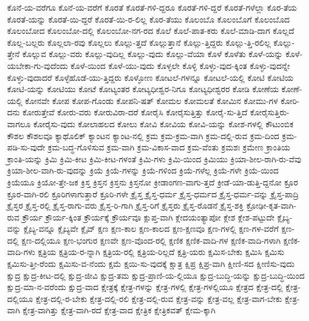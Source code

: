 {ಕೊನೆ-ಯ-ವರೆಗೂ
ಕೊನೆ-ಯ-ವರೆಗೆ
ಕೊರತೆ
ಕೊರತೆ-ಗಳಿ-ದ್ದರೂ
ಕೊರತೆ-ಗಳಿ-ದ್ದರೆ
ಕೊರತೆ-ಗಳೆಲ್ಲಾ
ಕೊರ-ತೆಯ
ಕೊರತೆ-ಯನ್ನು
ಕೊರತೆ-ಯಿ-ದ್ದರೆ
ಕೊರತೆ-ಯಿ-ರ-ಲಿಲ್ಲ
ಕೊರ-ತೆಯು
ಕೊಲಂಬೊ
ಕೊಲಂಬೊಗೆ
ಕೊಲಂಬೊದ
ಕೊಲಂಬೋದ
ಕೊಲಂಬೋ-ದಲ್ಲಿ
ಕೊಲಂಬೋ-ನಗ-ರದ
ಕೊಲೆ
ಕೊಲೆ-ಪಾತ-ಕರು
ಕೊಲೆ-ಮಾಡಿ-ದಾಗ
ಕೊಲ್ಲದೆ
ಕೊಲ್ಲ-ಬಲ್ಲರು
ಕೊಲ್ಲಲಾ-ರವು
ಕೊಲ್ಲಲು
ಕೊಲ್ಲು-ತ್ತದೆ
ಕೊಲ್ಲುತ್ತಾನೆ
ಕೊಲ್ಲು-ತ್ತಿದ್ದರು
ಕೊಲ್ಲು-ತ್ತಿ-ರಲಿಲ್ಲ
ಕೊಲ್ಲು-ತ್ತೇನೆ
ಕೊಲ್ಲುವ
ಕೊಲ್ಲು-ವರು
ಕೊಲ್ಲು-ವುದಿಲ್ಲ
ಕೊಲ್ಲು-ವುದು
ಕೊಲ್ಲು-ವೆಯಾ
ಕೊಳೆ
ಕೊಳೆತು
ಕೊಳೆ-ಯನ್ನು
ಕೊಳೆ-ಯಬೇಕಾ-ಗು-ವುದೆಂದು
ಕೊಳೆ-ಯಿಂದ
ಕೊಳೆ-ಯು-ವುದು
ಕೊಳ್ಳಲೇ
ಕೊಳ್ಳಿ
ಕೊಳ್ಳು-ವುದ-ಕ್ಕಿಂತ
ಕೊಳ್ಳು-ವುದನ್ನೇ
ಕೊಳ್ಳು-ವುದಾದರೆ
ಕೊಳ್ಳೆಹೊಡೆ-ಯು-ತ್ತಿದ್ದರು
ಕೊಳ್ಳೋಣ
ಕೋಟಲೆ-ಗಳನ್ನೂ
ಕೋಟಲೆ-ಯಲ್ಲಿ
ಕೋಟಿ
ಕೋಟಿಯ
ಕೋಟಿ-ಯನ್ನು
ಕೋಟಿಯು
ಕೋಟೆ
ಕೋಟ್ಯಂತರ
ಕೋಟ್ಯಧೀಶ್ವರ-ನಿಗೂ
ಕೋಟ್ಯಧೀಶ್ವರರ
ಕೋಡಿ
ಕೋಣೆಯ
ಕೋಣೆ-ಯಲ್ಲಿ
ಕೋನವೇ
ಕೋಪ
ಕೋಪ-ಗೊಂಡು
ಕೋಪನಿ-ಷತ್
ಕೋಮಲ
ಕೋಮಲತೆ
ಕೋಮಿನ
ಕೋಮು-ಗಳ
ಕೋರಿ-ದನು
ಕೋರುತ್ತೇವೆ
ಕೋರು-ವರು
ಕೋರುವಿರಾ-ದರೆ
ಕೋರೈಸಿ
ಕೋರೈಸುತ್ತಿತ್ತು
ಕೋರೈ-ಸು-ತ್ತಿದೆ
ಕೋರೈಸುತ್ತಿರು-ವಾಗಲೂ
ಕೋರೈಸು-ವುದು
ಕೋಲಾಹಲದ
ಕೋಲು
ಕೋವಿ
ಕೋವಿಯ
ಕೋವಿ-ಯನ್ನು
ಕೋಶ-ಗಳಲ್ಲಿ
ಕೌಟುಂಬಿಕ
ಕೌಶಲ
ಕೌಶಲವೂ
ಕ್ಯಾಥೊಲಿಕ್
ಕ್ಯಾಂಟನ
ಕ್ಯಾಂಟ-ನಲ್ಲಿ
ಕ್ರಮ
ಕ್ರಮ-ಕ್ರಮ-ವಾಗಿ
ಕ್ರಮ-ದಲ್ಲಿ-ರುವ
ಕ್ರಮ-ದಿಂದ
ಕ್ರಮ-ಪಡಿ-ಸು-ವುದೇ
ಕ್ರಮ-ಬದ್ಧ-ಗೊಳಿಸುವ
ಕ್ರಮ-ವಾಗಿ
ಕ್ರಮ-ವಿಕಾಸ-ವಾದ
ಕ್ರಮ-ವೆಂತು
ಕ್ರಮಶಃ
ಕ್ರಮೇಣ
ಕ್ರಾಂತಿಯ
ಕ್ರಾಂತಿ-ಯನ್ನು
ಕ್ರಿಮಿ
ಕ್ರಿಮಿ-ಕೀಟ
ಕ್ರಿಮಿ-ಕೀಟ-ಗಳಂತೆ
ಕ್ರಿಮಿ-ಗಳು
ಕ್ರಿಮಿ-ಯಿಂದ
ಕ್ರಿಮಿಯು
ಕ್ರಿಯಾ-ಶೀಲ-ರಾಗಿ-ರು-ವೆವು
ಕ್ರಿಯಾ-ಶೀಲ-ವಾಗಿ-ರು-ವುದನ್ನು
ಕ್ರಿಯೆ
ಕ್ರಿಯೆ-ಗಳನ್ನು
ಕ್ರಿಯೆ-ಗಳಿಂದ
ಕ್ರಿಯೆ-ಗಳೆಲ್ಲ
ಕ್ರಿಯೆ-ಗಳೇ
ಕ್ರಿಯೆ-ಯಿಂದ
ಕ್ರಿಯೆಯೂ
ಕ್ರಿಯೋ-ತ್ತೇ-ಜಕ
ಕ್ರಿಸ್ತ
ಕ್ರಿಸ್ತನ
ಕ್ರಿಸ್ತನು
ಕ್ರಿಸ್ತನೋ
ಕ್ರೀಡಾಂಗಣ-ವಾಗು-ತ್ತದೆ
ಕ್ರೀಡೆ-ಯಾ-ಡುತ್ತಿ-ದ್ದನೋ
ಕ್ರೂರ
ಕ್ರೂರ-ವಾಗಿ-ರಲಿ
ಕ್ರೂರಿಗಳಾಗುತ್ತಾರೆ
ಕ್ರೂರಿ-ಗಳೇ
ಕ್ರೈಸ್ತ
ಕ್ರೈಸ್ತ-ಧರ್ಮ
ಕ್ರೈಸ್ತ-ಧರ್ಮದ
ಕ್ರೈಸ್ತ-ಧರ್ಮ-ವನ್ನು
ಕ್ರೈಸ್ತ-ಪಾದ್ರಿ
ಕ್ರೈಸ್ತರ
ಕ್ರೈಸ್ತ-ರಲ್ಲಿ
ಕ್ರೈಸ್ತ-ರಾಗು-ವರು
ಕ್ರೈಸ್ತ-ರಿ-ಗಾಗಿ
ಕ್ರೈಸ್ತ-ರಿಗೆ
ಕ್ರೈಸ್ತರು
ಕ್ರೈಸ್ತ-ರೊಡನೆ
ಕ್ರೈಸ್ತ-ಶಕ್ತಿ
ಕ್ರೋಢೀ-ಕೃತ-ವಾಗಿ-ರುವ
ಕ್ರೌರ್ಯ
ಕ್ರೌರ್ಯ-ಕ್ಕಿಂತ
ಕ್ರೌರ್ಯಕ್ಕೆ
ಕ್ರೌರ್ಯವೂ
ಕ್ಲುಪ್ತ-ವಾಗಿ
ಕ್ಲೇದಯಂತ್ಯಾಪೋ
ಕ್ಲೇಶ
ಕ್ಲೇಶ-ಪಟ್ಟುದೇ
ಕ್ಲೈಬ್ಯ-ವನ್ನು
ಕ್ಲೈಬ್ಯ-ವನ್ನೂ
ಕ್ಲೈಬ್ಯವೇ
ಕ್ಲೈವ್
ಕ್ಷಣ
ಕ್ಷಣ-ಕಾಲ
ಕ್ಷಣ-ಕಾಲದ
ಕ್ಷಣ-ಕ್ಷಣವೂ
ಕ್ಷಣ-ಗಳಲ್ಲಿ
ಕ್ಷಣ-ಗಳ-ವರೆಗೆ
ಕ್ಷಣ-ದಲ್ಲಿ
ಕ್ಷಣ-ದಲ್ಲಿಯೂ
ಕ್ಷಣ-ಭಂಗುರ
ಕ್ಷಣವೇ
ಕ್ಷಣ-ವೊಂದ-ರಲ್ಲಿ
ಕ್ಷಣಿಕ
ಕ್ಷಣಿಕ-ವಾದಿ-ಗಳ
ಕ್ಷಣಿಕ-ವಾದಿ-ಗಳಾಗಿ
ಕ್ಷಣಿಕ-ವಾದಿ-ಗಳು
ಕ್ಷತ್ರಿಯ
ಕ್ಷತ್ರಿಯ-ರ-ನ್ನಾಗಿ
ಕ್ಷತ್ರಿಯ-ರಲ್ಲಿ
ಕ್ಷತ್ರಿಯ-ರಿಲ್ಲದೆ
ಕ್ಷತ್ರಿ-ಯರು
ಕ್ಷಮಿಸ-ಬೇಕು
ಕ್ಷಮಿಸಿ
ಕ್ಷಮಿಸು
ಕ್ಷಮಿಸು-ತ್ತೀ-ರೆಂದು
ಕ್ಷಮಿಸು-ವ-ನೆಂದು
ಕ್ಷಮೆ
ಕ್ಷಯಿ-ಸು-ವುದಕ್ಕೆ
ಕ್ಷಾತ್ರ
ಕ್ಷಿಪ್ರ
ಕ್ಷಿಪ್ರ-ವಾಗಿ
ಕ್ಷೀಣಿ-ಸದ
ಕ್ಷೀಣಿಸು-ವುದು
ಕ್ಷುದ್ರ
ಕ್ಷುದ್ರ-ಕೀಟ-ದಲ್ಲಿ
ಕ್ಷುದ್ರ-ಜೀವಿ
ಕ್ಷುದ್ರ-ತಮ
ಕ್ಷುದ್ರ-ಪ್ರಾಣಿ-ಯ-ಲ್ಲಿಯೂ
ಕ್ಷುದ್ರ-ಬುದ್ಧಿ-ಯನ್ನು
ಕ್ಷುದ್ರ-ಬುದ್ಧಿ-ಯಿಂದ
ಕ್ಷುದ್ರ-ಮಾ-ನ-ವರೆಂದು
ಕ್ಷುದ್ರ-ವಾದ
ಕ್ಷೇತ್ರಕ್ಕೆ
ಕ್ಷೇತ್ರ-ಗಳನ್ನು
ಕ್ಷೇತ್ರ-ಗಳಲ್ಲಿ
ಕ್ಷೇತ್ರ-ಗಳಲ್ಲಿಯೂ
ಕ್ಷೇತ್ರದ
ಕ್ಷೇತ್ರ-ದಲ್ಲಿ
ಕ್ಷೇತ್ರ-ದಲ್ಲಿಯೂ
ಕ್ಷೇತ್ರ-ದಲ್ಲಿ-ರ-ಬೇಕು
ಕ್ಷೇತ್ರ-ದಲ್ಲಿ-ರಲಿ
ಕ್ಷೇತ್ರ-ದಲ್ಲಿ-ರುವ
ಕ್ಷೇತ್ರ-ವನ್ನು
ಕ್ಷೇತ್ರ-ವಲ್ಲ
ಕ್ಷೇತ್ರ-ವಾಗ-ಬೇಕು
ಕ್ಷೇತ್ರ-ವಾಗಿ
ಕ್ಷೇತ್ರ-ವಾಗಿತ್ತು
ಕ್ಷೇತ್ರ-ವಾಗಿ-ರದೆ
ಕ್ಷೇತ್ರ-ವಾದ
ಕ್ಷೇತ್ರಿಕ
ಕ್ಷೇತ್ರಿಕವತ್
ಕ್ಷೇಮ-ಕ್ಕಾಗಿ
}
